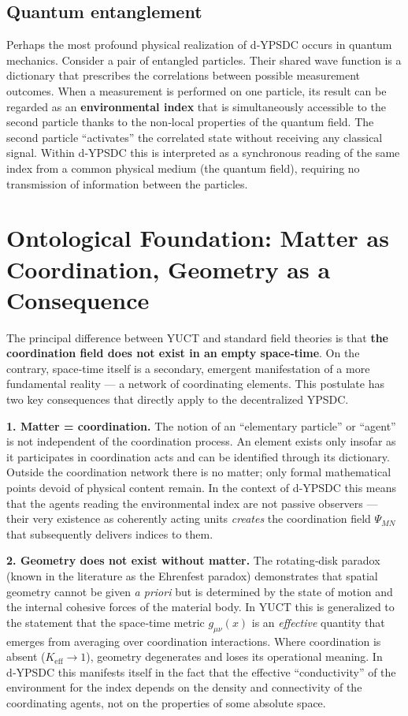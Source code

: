 \documentclass[12pt,a4paper]{article}
\begin{document}
	\subsection{Quantum entanglement}
	
	Perhaps the most profound physical realization of d‑YPSDC occurs in quantum mechanics. Consider a pair of entangled particles. Their shared wave function is a dictionary that prescribes the correlations between possible measurement outcomes. When a measurement is performed on one particle, its result can be regarded as an \textbf{environmental index} that is simultaneously accessible to the second particle thanks to the non‑local properties of the quantum field. The second particle “activates” the correlated state without receiving any classical signal. Within d‑YPSDC this is interpreted as a synchronous reading of the same index from a common physical medium (the quantum field), requiring no transmission of information between the particles.
	
	\section{Ontological Foundation: Matter as Coordination, Geometry as a Consequence}
	
	The principal difference between YUCT and standard field theories is that \textbf{the coordination field does not exist in an empty space‑time}. On the contrary, space‑time itself is a secondary, emergent manifestation of a more fundamental reality — a network of coordinating elements. This postulate has two key consequences that directly apply to the decentralized YPSDC.
	
	\textbf{1. Matter = coordination.} The notion of an “elementary particle” or “agent” is not independent of the coordination process. An element exists only insofar as it participates in coordination acts and can be identified through its dictionary. Outside the coordination network there is no matter; only formal mathematical points devoid of physical content remain. In the context of d‑YPSDC this means that the agents reading the environmental index are not passive observers — their very existence as coherently acting units \emph{creates} the coordination field \(\Psi_{MN}\) that subsequently delivers indices to them.
	
	\textbf{2. Geometry does not exist without matter.} The rotating‑disk paradox (known in the literature as the Ehrenfest paradox) demonstrates that spatial geometry cannot be given \emph{a priori} but is determined by the state of motion and the internal cohesive forces of the material body. In YUCT this is generalized to the statement that the space‑time metric \(g_{\mu\nu}(x)\) is an \emph{effective} quantity that emerges from averaging over coordination interactions. Where coordination is absent (\(K_{\mathrm{eff}} \to 1\)), geometry degenerates and loses its operational meaning. In d‑YPSDC this manifests itself in the fact that the effective “conductivity” of the environment for the index depends on the density and connectivity of the coordinating agents, not on the properties of some absolute space.
	
\end{document}
